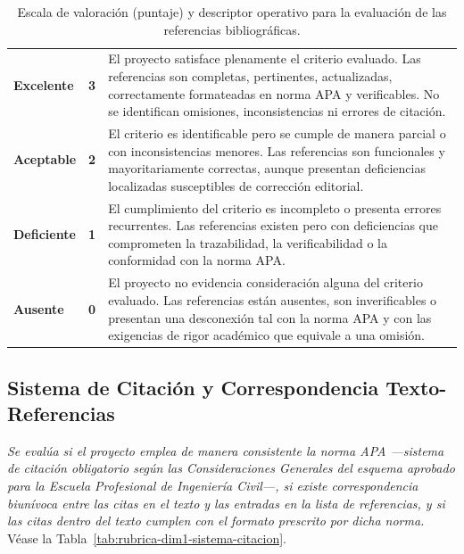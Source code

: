 \vspace{-10pt}
\begin{table}[htbp]
\centering
\scriptsize
\caption{Escala de valoración (puntaje) y descriptor operativo para la evaluación de las referencias bibliográficas.}
\label{tab:escala-referencias}
\begin{tabularx}{\textwidth}{|C{2.8cm}|C{1cm}|X|}
\hline
{}
 &  &  \\ \hline
\textcolor{csuf}{\textbf{Excelente}} & \textbf{3} & El proyecto satisface plenamente el criterio evaluado. Las referencias son completas, pertinentes, actualizadas, correctamente formateadas en norma APA y verificables. No se identifican omisiones, inconsistencias ni errores de citación. \\ \hline
{}
\textcolor{cace}{\textbf{Aceptable}} & \textbf{2} & El criterio es identificable pero se cumple de manera parcial o con inconsistencias menores. Las referencias son funcionales y mayoritariamente correctas, aunque presentan deficiencias localizadas susceptibles de corrección editorial. \\ \hline
\textcolor{cdef}{\textbf{Deficiente}} & \textbf{1} & El cumplimiento del criterio es incompleto o presenta errores recurrentes. Las referencias existen pero con deficiencias que comprometen la trazabilidad, la verificabilidad o la conformidad con la norma APA. \\ \hline
{}
\textcolor{cins}{\textbf{Ausente}} & \textbf{0} & El proyecto no evidencia consideración alguna del criterio evaluado. Las referencias están ausentes, son inverificables o presentan una desconexión tal con la norma APA y con las exigencias de rigor académico que equivale a una omisión. \\ \hline
\end{tabularx}
\end{table}

\clearpage
\subsection{Sistema de Citación y Correspondencia Texto-Referencias}

\textit{Se evalúa si el proyecto emplea de manera consistente la norma APA ---sistema de citación obligatorio según las Consideraciones Generales del esquema aprobado para la Escuela Profesional de Ingeniería Civil---, si existe correspondencia biunívoca entre las citas en el texto y las entradas en la lista de referencias, y si las citas dentro del texto cumplen con el formato prescrito por dicha norma.} Véase la Tabla~\ref{tab:rubrica-dim1-sistema-citacion}.

